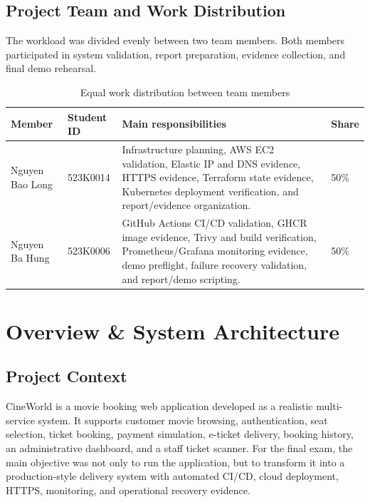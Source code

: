 \documentclass[12pt,a4paper]{report}
\begin{document}
\section*{Project Team and Work Distribution}
The workload was divided evenly between two team members. Both members participated in system validation, report preparation, evidence collection, and final demo rehearsal.

\begin{table}[H]
\centering
\caption{Equal work distribution between team members}
\begin{tabularx}{\textwidth}{p{} p{} X p{}}
\toprule
\textbf{Member} & \textbf{Student ID} & \textbf{Main responsibilities} & \textbf{Share} \\
\midrule
Nguyen Bao Long & 523K0014 & Infrastructure planning, AWS EC2 validation, Elastic IP and DNS evidence, HTTPS evidence, Terraform state evidence, Kubernetes deployment verification, and report/evidence organization. & 50\% \\
\midrule
Nguyen Ba Hung & 523K0006 & GitHub Actions CI/CD validation, GHCR image evidence, Trivy and build verification, Prometheus/Grafana monitoring evidence, demo preflight, failure recovery validation, and report/demo scripting. & 50\% \\
\bottomrule
\end{tabularx}
\end{table}

\tableofcontents
\listoffigures
\clearpage
{}

\chapter{Overview \& System Architecture}

\section{Project Context}
CineWorld is a movie booking web application developed as a realistic multi-service system. It supports customer movie browsing, authentication, seat selection, ticket booking, payment simulation, e-ticket delivery, booking history, an administrative dashboard, and a staff ticket scanner. For the final exam, the main objective was not only to run the application, but to transform it into a production-style delivery system with automated CI/CD, cloud deployment, HTTPS, monitoring, and operational recovery evidence.
\end{document}
